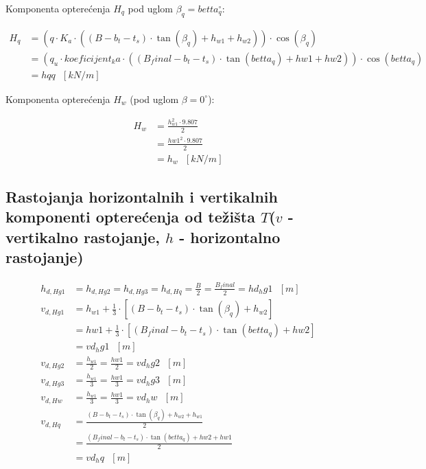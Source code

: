 \documentclass[a4paper, 11pt]{article}
\begin{document}
Komponenta optere\'cenja $H_{q}$ pod uglom $\beta_{q} = betta_q ^ \circ$:

\begin{align*}
H_{q} &=   \left(q \cdot K_{a} \cdot ((B - b_{t} - t_{s}) \cdot \tan (\beta_q) + h_{w1} + h_{w2}) \right) \cdot \cos(\beta_{q})  \\
	  &= \left( q_u \cdot koeficijent_ka \cdot ((B_final - b_t - t_s) \cdot \tan (betta_q) + hw1 + hw2) \right) \cdot \cos(betta_q)  \\
	  &= hqq \text{ } [kN/m]
\end{align*}

Komponenta optere\'cenja $H_{w}$ (pod uglom $\beta=0^\circ$):

\begin{align*}
H_{w} &=  \frac{h_{w1}^2 \cdot 9.807}{2} \\
      &= \frac{hw1^2 \cdot 9.807}{2} \\
      &= h_w \text{ } [kN/m]
\end{align*}

\subsection*{Rastojanja horizontalnih i vertikalnih komponenti optere\'cenja od te\v{z}i\v{s}ta $T$($v$ - vertikalno rastojanje, $h$ - horizontalno rastojanje)}

\begin{align*}
h_{d,Hg1} &= h_{d,Hg2} = h_{d,Hg3} = h_{d,Hq}  = \frac{B}{2} = \frac{B_final}{2} = hd_hg1 \text{ } [m]\\
v_{d,Hg1} &= h_{w1} + \frac{1}{3} \cdot \left[(B - b_{t} - t_{s}) \cdot \tan(\beta_{q}) + h_{w2}\right] \\
         &= hw1 + \frac{1}{3} \cdot \left[(B_final - b_t - t_s) \cdot \tan(betta_q) + hw2 \right] \\
         &= vd_hg1 \text{ } [m] \\
v_{d,Hg2} &= \frac{h_{w1}}{2} = \frac{hw1}{2} =  vd_hg2 \text{ } [m] \\
v_{d,Hg3} &=  \frac{h_{w1}}{3} = \frac{hw1}{3} =  vd_hg3 \text{ } [m] \\
v_{d,Hw} &= \frac{h_{w1}}{3} = \frac{hw1}{3} =  vd_hw \text{ } [m] \\
v_{d,Hq} &= \frac{(B - b_{t} - t_{s}) \cdot \tan(\beta_{q}) + h_{w2} + h_{w1}}{2} \\
		&= \frac{(B_final - b_t - t_s) \cdot \tan(betta_q) + hw2 + hw1}{2} \\
		&= vd_hq \text{ } [m]
\end{align*}
\end{document}
